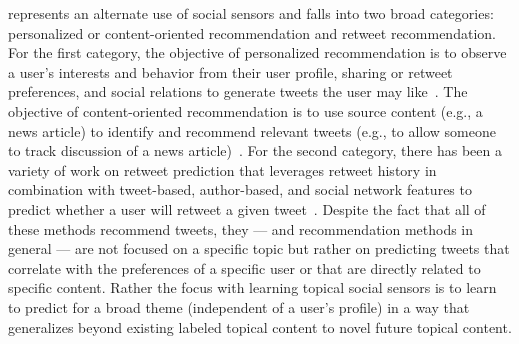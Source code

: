%

%

% 

\vspace{2mm}
 represents an alternate use of
social sensors and falls into two broad categories: personalized or
content-oriented recommendation and retweet recommendation.  For the
first category, the objective of personalized recommendation is to
observe a user's interests and behavior from their user profile,
sharing or retweet preferences, and social relations to generate
tweets the user may like~\citep{Yan,chen}.  The objective of
content-oriented recommendation is to use source content (e.g., a news
article) to identify and recommend relevant tweets (e.g., to allow
someone to track discussion of a news article)~\citep{Krestel}.  For
the second category, there has been a variety of work on retweet
prediction that leverages retweet history in combination with
tweet-based, author-based, and social network features to predict
whether a user will retweet a given
tweet~\citep{can,xu,petrovicOsborne}.  Despite the fact that all of
these methods recommend tweets, they --- and recommendation methods in
general --- are not focused on a specific topic but rather on
predicting tweets that correlate with the preferences of a specific
user or that are directly related to specific content.  Rather the
focus with learning topical social sensors is to learn to predict for
a broad theme (independent of a user's profile) in a way that
generalizes beyond existing labeled topical content to novel future
topical content.

